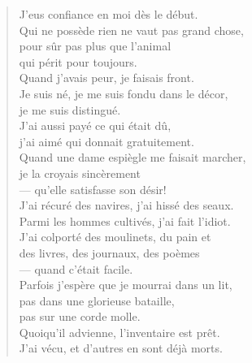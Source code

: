 \documentclass[11pt]{extbook}
\newcommand*{\centeredornament}{\centerline{\pgfornament[width=6cm]{88}}}
\begin{document}
\begin{verse}
  J'eus confiance en moi dès le début. \\
  Qui ne possède rien ne vaut pas grand chose, \\
  pour sûr pas plus que l'animal \\
  qui périt pour toujours. \\
  Quand j'avais peur, je faisais front. \\
  Je suis né, je me suis fondu dans le décor, \\
  je me suis distingué. \\
  J'ai aussi payé ce qui était dû, \\
  j'ai aimé qui donnait gratuitement. \\
  Quand une dame espiègle me faisait marcher,\hspace*{-1mm} \\
  je la croyais sincèrement \\
  --- qu'elle satisfasse son désir! \\
  J'ai récuré des navires, j'ai hissé des seaux. \\
  Parmi les hommes cultivés, j'ai fait l'idiot. \\
  J'ai colporté des moulinets, du pain et \\
  des livres, des journaux, des poèmes \\
  --- quand c'était facile. \\
  Parfois j'espère que je mourrai dans un lit, \\
  pas dans une glorieuse bataille, \\
  pas sur une corde molle. \\
  Quoiqu'il advienne, l'inventaire est prêt. \\
  J'ai vécu, et d'autres en sont déjà morts.
\end{verse}

\newpage

\vspace*{-15mm}
\centeredornament


\end{document}
